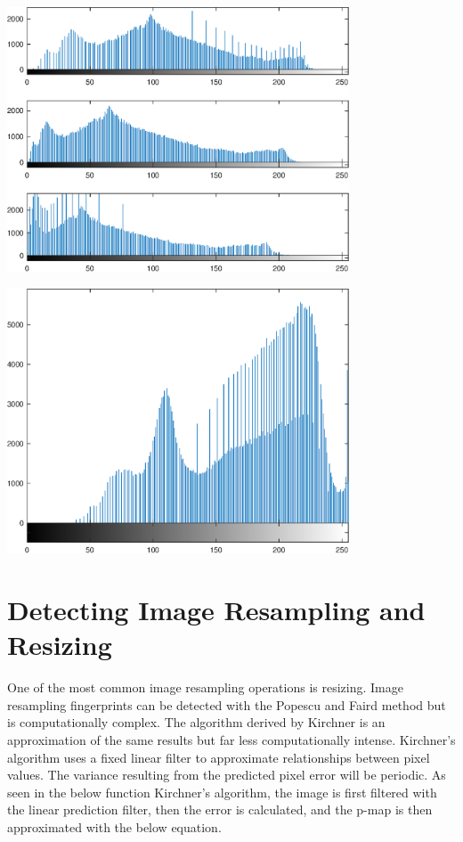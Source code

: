 \documentclass{article}
\begin{document}
\includegraphics [width=4in]{lab6_05.eps}

\includegraphics [width=4in]{lab6_06.eps}


\section{Detecting Image Resampling and Resizing}

\qquad One of the most common image resampling operations is resizing. Image
resampling fingerprints can be detected with the Popescu and Faird method
but is computationally complex. The algorithm derived by Kirchner is an
approximation of the same results but far less computationally intense. 
Kirchner's algorithm uses a fixed linear filter to approximate relationships
between pixel values. The variance resulting from the predicted pixel error
will be periodic. As seen in the below function Kirchner's algorithm, the
image is first filtered with the linear prediction filter, then the error is
calculated, and the p-map is then approximated with the below equation. 
 
\end{document}
